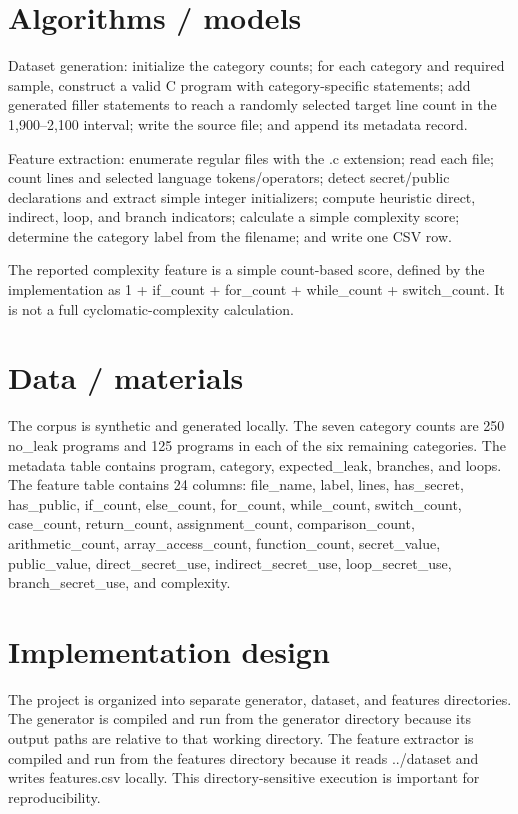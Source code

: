 \documentclass[12pt,a4paper,oneside]{report}
\begin{document}
\section{Algorithms / models}
Dataset generation: initialize the category counts; for each category and required sample, construct a valid C program with category-specific statements; add generated filler statements to reach a randomly selected target line count in the 1,900--2,100 interval; write the source file; and append its metadata record.\par
Feature extraction: enumerate regular files with the .c extension; read each file; count lines and selected language tokens/operators; detect secret/public declarations and extract simple integer initializers; compute heuristic direct, indirect, loop, and branch indicators; calculate a simple complexity score; determine the category label from the filename; and write one CSV row.\par
The reported complexity feature is a simple count-based score, defined by the implementation as 1 + if\_count + for\_count + while\_count + switch\_count. It is not a full cyclomatic-complexity calculation.\par

\section{Data / materials}
The corpus is synthetic and generated locally. The seven category counts are 250 no\_leak programs and 125 programs in each of the six remaining categories. The metadata table contains program, category, expected\_leak, branches, and loops. The feature table contains 24 columns: file\_name, label, lines, has\_secret, has\_public, if\_count, else\_count, for\_count, while\_count, switch\_count, case\_count, return\_count, assignment\_count, comparison\_count, arithmetic\_count, array\_access\_count, function\_count, secret\_value, public\_value, direct\_secret\_use, indirect\_secret\_use, loop\_secret\_use, branch\_secret\_use, and complexity.\par

\section{Implementation design}
The project is organized into separate generator, dataset, and features directories. The generator is compiled and run from the generator directory because its output paths are relative to that working directory. The feature extractor is compiled and run from the features directory because it reads ../dataset and writes features.csv locally. This directory-sensitive execution is important for reproducibility.\par
\end{document}
